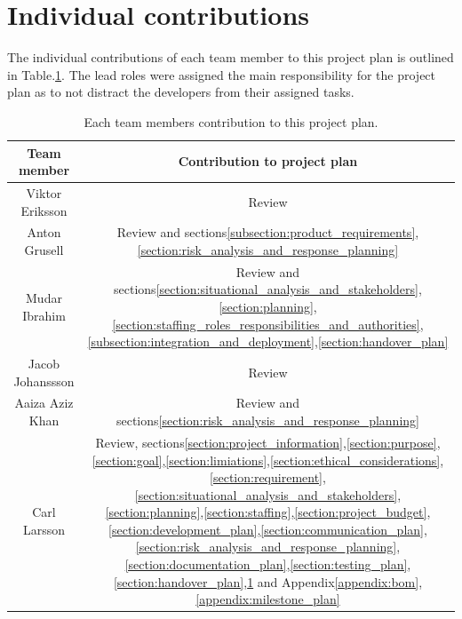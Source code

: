 \section{Individual contributions}
\label{section:individual_contributions}

The individual contributions of each team member to this project plan is outlined in Table.\:\ref{tab:individual_contributions}. The lead roles were assigned the main responsibility for the project plan as to not distract the developers from their assigned tasks.

\begin{table}[H]
    \centering
    \caption{Each team members contribution to this project plan.}
    \label{tab:individual_contributions}
    \begin{tabular}{|c|c|}
        \hline
        \textbf{Team member}    & \textbf{Contribution to project plan}                                                         \\ \hline
        Viktor Eriksson         & Review                                                                                        \\ \hline
        Anton Grusell           & Review and sections\:\ref{subsection:product_requirements},\ref{section:risk_analysis_and_response_planning}                                                                                        \\ \hline
        Mudar Ibrahim           & Review and sections\:\ref{section:situational_analysis_and_stakeholders},\ref{section:planning},\ref{section:staffing_roles_responsibilities_and_authorities},\ref{subsection:integration_and_deployment},\ref{section:handover_plan}                                                                                                                                                      \\ \hline
        Jacob Johanssson        & Review                                                                                        \\ \hline
        Aaiza Aziz Khan         & Review and sections\:\ref{section:risk_analysis_and_response_planning}                                                                                       \\ \hline
        Carl Larsson            & Review, sections\:\ref{section:project_information},\ref{section:purpose},\ref{section:goal},\ref{section:limiations},\ref{section:ethical_considerations},\ref{section:requirement},\ref{section:situational_analysis_and_stakeholders},\ref{section:planning},\ref{section:staffing},\ref{section:project_budget},\ref{section:development_plan},\ref{section:communication_plan},\ref{section:risk_analysis_and_response_planning},\ref{section:documentation_plan},\ref{section:testing_plan},\ref{section:handover_plan},\ref{section:individual_contributions} and Appendix\:\ref{appendix:bom},\ref{appendix:milestone_plan}                                                                                                                                                                                                  \\ \hline

\end{tabular}
\end{table}

